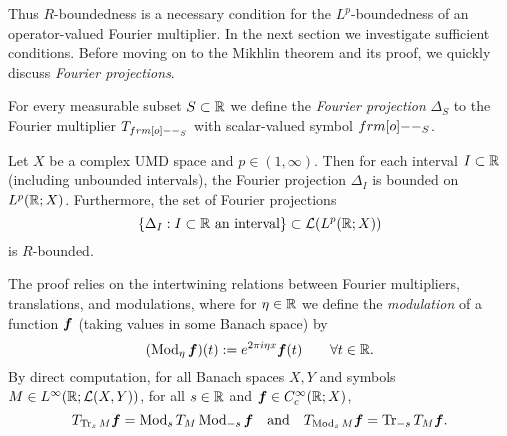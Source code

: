 Thus $R$-boundedness is a necessary condition for the $L^p$-boundedness of an operator-valued Fourier multiplier.
In the next section we investigate sufficient conditions.
Before moving on to the Mikhlin theorem and its proof, we quickly discuss \emph{Fourier projections}.

\begin{defn}
  For every measurable subset $S \subset \mathbb{R}$ we define the \emph{Fourier projection} $\Delta_{S}$ to the Fourier multiplier $T_{\1_{S}}$ with scalar-valued symbol $\1_{S}$.
\end{defn}

\begin{prop}\label{prop:Fproj-Rbd}
  Let $X$ be a complex UMD space and $p \in (1,\infty)$.
  Then for each interval $I \subset \mathbb{R}$ (including unbounded intervals), the Fourier projection $\Delta_{I}$ is bounded on $L^p(\mathbb{R};X)$.
  Furthermore, the set of Fourier projections
  \begin{equation*}
    \{\Delta_{I} : \text{$I \subset \mathbb{R}$ an interval} \} \subset \mathcal{L}(L^p(\mathbb{R};X))
  \end{equation*}
  is $R$-bounded.
\end{prop}

The proof relies on the intertwining relations between Fourier multipliers, translations, and modulations, where for $\eta \in \mathbb{R}$ we define the \emph{modulation} of a function $\bm{f}$ (taking values in some Banach space) by
\begin{equation*}
  (\operatorname{Mod}_{\eta} \bm{f})(t) := e^{2\pi i \eta x} \bm{f}(t) \qquad \forall t \in \mathbb{R}.
\end{equation*}
By direct computation, for all Banach spaces $X,Y$ and symbols $M \in L^\infty(\mathbb{R};\mathcal{L}(X,Y))$, for all $s \in \mathbb{R}$ and $\bm{f} \in C^{\infty}_{c}(\mathbb{R};X)$,
\begin{equation*}
  T_{\operatorname{Tr}_{s} M} \bm{f} = \operatorname{Mod}_{s} T_{M} \operatorname{Mod}_{-s} \bm{f} \quad \text{and} \quad
  T_{\operatorname{Mod}_{s} M} \bm{f} = \operatorname{Tr}_{-s} T_{M} \bm{f}. 
\end{equation*}

